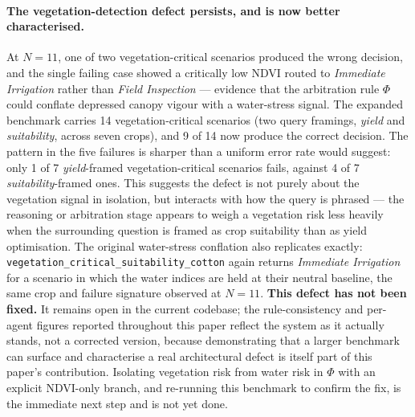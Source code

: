 \documentclass[preprint,12pt]{elsarticle}
\begin{document}
\paragraph{The vegetation-detection defect persists, and is now better
characterised.} At $N=11$, one of two vegetation-critical scenarios
produced the wrong decision, and the single failing case showed a
critically low NDVI routed to \emph{Immediate Irrigation} rather than
\emph{Field Inspection} --- evidence that the arbitration rule $\Phi$
could conflate depressed canopy vigour with a water-stress signal. The
expanded benchmark carries 14 vegetation-critical scenarios (two query
framings, \emph{yield} and \emph{suitability}, across seven crops), and
9 of 14 now produce the correct decision. The pattern in the five
failures is sharper than a uniform error rate would suggest: only 1 of 7
\emph{yield}-framed vegetation-critical scenarios fails, against 4 of 7
\emph{suitability}-framed ones. This suggests the defect is not purely
about the vegetation signal in isolation, but interacts with how the
query is phrased --- the reasoning or arbitration stage appears to weigh
a vegetation risk less heavily when the surrounding question is framed
as crop suitability than as yield optimisation. The original
water-stress conflation also replicates exactly:
\texttt{vegetation\_\allowbreak{}critical\_\allowbreak{}suitability\_\allowbreak{}cotton} again returns
\emph{Immediate Irrigation} for a scenario in which the water indices are
held at their neutral baseline, the same crop and failure signature
observed at $N=11$. \textbf{This defect has not been fixed.} It remains
open in the current codebase; the rule-consistency and per-agent figures
reported throughout this paper reflect the system as it actually stands,
not a corrected version, because demonstrating that a larger benchmark
can surface and characterise a real architectural defect is itself
part of this paper's contribution. Isolating vegetation risk from water
risk in $\Phi$ with an explicit NDVI-only branch, and re-running this
benchmark to confirm the fix, is the immediate next step and is not yet
done.
\end{document}
